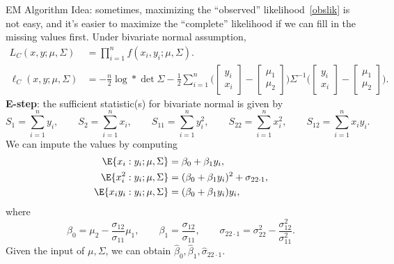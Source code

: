 \begin{Example}{EM Algorithm}
    Idea: sometimes, maximizing the ``observed'' likelihood~\ref{obslik}
    is not easy, and it's easier to maximize the ``complete''
    likelihood if we can fill in the missing values first. Under bivariate normal
    assumption,
    \begin{align*}
        L_C(x,y;\mu,\Sigma)
         & =\prod_{i=1}^n f(x_i,y_i;\mu,\Sigma). \\
        \ell_C(x,y;\mu,\Sigma)
         & =-\frac{n}{2}\log*{\det{\Sigma}}
        -\frac{1}{2}
        \sum_{i=1}^{n}\biggl(\begin{bmatrix}
                                     y_i \\
                                     x_i
                                 \end{bmatrix}-\begin{bmatrix}
                                                   \mu_1 \\
                                                   \mu_2
                                               \end{bmatrix}\biggr)
        \Sigma^{-1}
        \biggl(\begin{bmatrix}
                       y_i \\
                       x_i
                   \end{bmatrix}-
        \begin{bmatrix}
                \mu_1 \\
                \mu_2
            \end{bmatrix}\biggr).
    \end{align*}
    \textbf{E-step}: the sufficient statistic(s) for bivariate normal is given by
    \[ S_1=\sum_{i=1}^{n}y_i,\qquad S_2=\sum_{i=1}^{n}x_i,
        \qquad S_{11}=\sum_{i=1}^{n}y_i^2,\qquad
        S_{22}=\sum_{i=1}^{n}x_i^2,\qquad
        S_{12}=\sum_{i=1}^{n}x_i y_i. \]
    We can impute the values by computing
    \begin{align*}
        \E{x_i\given y_i;\mu,\Sigma}
         & =\beta_0+\beta_1 y_i,      \\
        \E{x_i^2\given y_i;\mu,\Sigma}
         & =(\beta_0+\beta_1 y_i)^2+
        \sigma_{22\cdot 1},           \\
        \E{x_i y_i\given y_i;\mu,\Sigma}
         & =(\beta_0+\beta_1 y_i)y_i,
    \end{align*}
    where
    \[ \beta_0=\mu_2-\frac{\sigma_{12}}{\sigma_{11}}\mu_1,\qquad
        \beta_1=\frac{\sigma_{12}}{\sigma_{11}},\qquad
        \sigma_{22\cdot 1}=\sigma_{22}^2-\frac{\sigma_{12}^2}{\sigma_{11}^2}. \]
    Given the input of $ \mu,\Sigma $, we can obtain $ \hat{\beta}_0,\hat{\beta}_1,\hat{\sigma}_{22\cdot 1} $.


\end{Example}

